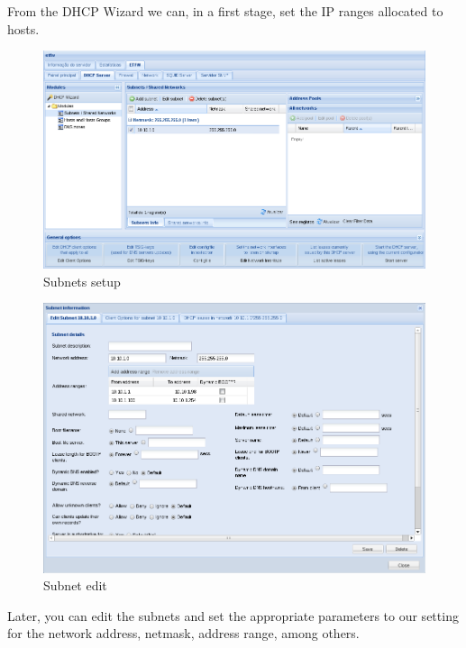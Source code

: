 From the DHCP Wizard we can, in a first stage, set the IP ranges allocated to hosts.

\begin{figure}[H]
    \begin{center}
    \includegraphics[scale=0.38]{screenshots/etfw/etfw_dhcp_subnets_01.png}
    \caption{Subnets setup}
    \label{fig:etfw_dhcp_subnets_01}
    \end{center}
\end{figure}

\begin{figure}[H]
    \begin{center}
    \includegraphics[scale=0.38]{screenshots/etfw/etfw_dhcp_subnets_02.png}
    \caption{Subnet edit}
    \label{fig:etfw_dhcp_subnets_02}
    \end{center}
\end{figure}

Later, you can edit the subnets and set the appropriate parameters to our setting for the network address, netmask, address range, among others.

